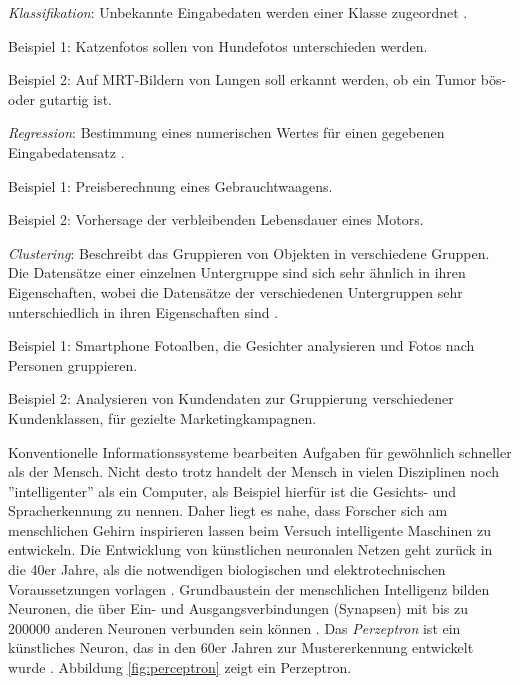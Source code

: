 \begin{itemize*}

\item \emph{Klassifikation}: Unbekannte Eingabedaten werden einer Klasse zugeordnet \cite [vgl. S. 68]{EM17}. 
\begin{itemize*}
\item Beispiel 1: Katzenfotos sollen von Hundefotos unterschieden werden.
\item Beispiel 2: Auf MRT-Bildern von Lungen soll erkannt werden, ob ein Tumor bös- oder gutartig ist.
\end{itemize*}
\item \emph{Regression}: Bestimmung eines numerischen Wertes für einen gegebenen Eingabedatensatz \cite {SG17}.   
\begin{itemize*}
\item Beispiel 1: Preisberechnung eines Gebrauchtwaagens.  
\item Beispiel 2: Vorhersage der verbleibenden Lebensdauer eines Motors.
\end{itemize*}
\item \emph{Clustering}: Beschreibt das Gruppieren von Objekten in verschiedene Gruppen. Die Datensätze einer einzelnen Untergruppe sind sich sehr ähnlich in ihren Eigenschaften, wobei die Datensätze der verschiedenen Untergruppen sehr unterschiedlich in ihren Eigenschaften sind \cite {SG17}.   
\begin{itemize*}
\item Beispiel 1: Smartphone Fotoalben, die Gesichter analysieren und Fotos nach Personen gruppieren.  
\item Beispiel 2: Analysieren von Kundendaten zur Gruppierung verschiedener Kundenklassen, für gezielte Marketingkampagnen. 
\end{itemize*}

\end{itemize*}   

Konventionelle Informationssysteme bearbeiten Aufgaben für gewöhnlich schneller als der Mensch. Nicht desto trotz handelt der Mensch in vielen Disziplinen noch ''intelligenter'' als ein Computer, als Beispiel hierfür ist die Gesichts- und Spracherkennung zu nennen. Daher liegt es nahe, dass Forscher sich am menschlichen Gehirn inspirieren lassen beim Versuch intelligente Maschinen zu entwickeln. Die Entwicklung von künstlichen neuronalen Netzen geht zurück in die 40er Jahre, als die notwendigen biologischen und elektrotechnischen Voraussetzungen vorlagen \cite [vgl. S. 1]{HS97}. Grundbaustein der menschlichen Intelligenz bilden Neuronen, die über Ein- und Ausgangsverbindungen (Synapsen) mit bis zu 200000 anderen Neuronen verbunden sein können \cite [vgl. S. 5]{SS97}. Das \textit{Perzeptron} ist ein künstliches Neuron, das in den 60er Jahren zur Mustererkennung entwickelt wurde \cite [vgl. S. 86]{EA16}. Abbildung \ref{fig:perceptron} zeigt ein Perzeptron.  

